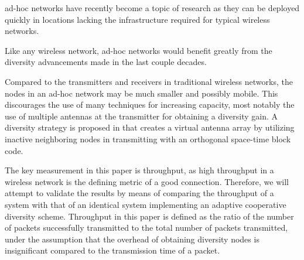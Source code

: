 ad-hoc networks have recently become a topic of research as they can be deployed quickly in locations lacking the infrastructure required for typical wireless networks.

Like any wireless network, ad-hoc networks would benefit greatly from the diversity advancements made in the last couple decades.

Compared to the transmitters and receivers in traditional wireless networks, the nodes in an ad-hoc network may be much smaller and possibly mobile.
This discourages the use of many techniques for increasing capacity, most notably the use of multiple antennas at the transmitter for obtaining a diversity gain.
A diversity strategy is proposed in \cite{4686273} that creates a virtual antenna array by utilizing inactive neighboring nodes in transmitting with an orthogonal space-time block code.

The key measurement in this paper is throughput, as high throughput in a wireless network is the defining metric of a good connection.  Therefore, we will attempt to validate the results by means of comparing the throughput of a system with that of an identical system implementing an adaptive cooperative diversity scheme. Throughput in this paper is defined as the ratio of the number of packets successfully transmitted to the total number of packets transmitted, under the assumption that the overhead of obtaining diversity nodes is insignificant compared to the transmission time of a packet.
